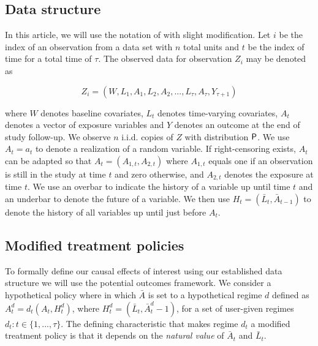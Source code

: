 \documentclass[]{jss}
\begin{document}
\hypertarget{data-structure}{%
\subsection{Data structure}\label{data-structure}}

In this article, we will use the notation of
\citet{diazNonparametricCausalEffects2020a} with slight modification.
Let \(i\) be the index of an observation from a data set with \(n\)
total units and \(t\) be the index of time for a total time of \(\tau\).
The observed data for observation \(Z_i\) may be denoted as

\begin{equation}
Z_i = (W, L_1, A_1, L_2, A_2, ..., L_{\tau}, A_{\tau}, Y_{\tau + 1}) 
\end{equation}

where \(W\) denotes baseline covariates, \(L_t\) denotes time-varying
covariates, \(A_t\) denotes a vector of exposure variables and \(Y\)
denotes an outcome at the end of study follow-up. We observe \(n\)
i.i.d. copies of \(Z\) with distribution \(\mathsf{P}\). We use \(A_t = a_t\) to
denote a realization of a random variable. If right-censoring
exists, \(A_t\) can be adapted so that \(A_t = (A_{1, t}, A_{2, t})\)
where \(A_{1, t}\) equals one if an observation is still in the study at
time \(t\) and zero otherwise, and \(A_{2, t}\) denotes the exposure at
time \(t\). We use an overbar to indicate the history of a variable up
until time \(t\) and an underbar to denote the future of a variable. We
then use \(H_t = (\bar{L}_t, \bar{A}_{t-1})\) to denote the history of
all variables up until just before \(A_t\).

\hypertarget{modified-treatment-policies}{%
\subsection{Modified treatment
policies}\label{modified-treatment-policies}}

To formally define our causal effects of interest using our established
data structure we will use the potential outcomes framework. We consider
a hypothetical policy where in which \(\bar{A}\) is set to a
hypothetical regime \(d\) defined as \(A^{d}_t = d_t(A_t, H^{d}_t)\),
where \(H^{d}_t = (\bar{L}_t, \bar{A}^{d}_t - 1)\), for a set of
user-given regimes \(d_t:t \in \{1, ..., \tau\}\). The defining
characteristic that makes regime \(d_t\) a modified treatment policy is
that it depends on the \emph{natural value} of \(\bar{A}_t\) and
\(\bar{L}_t\).
\end{document}
